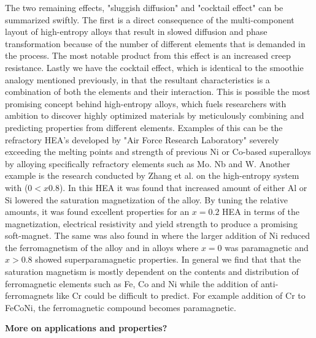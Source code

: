 The two remaining effects, "sluggish diffusion" and "cocktail effect" can be summarized swiftly. The first is a direct consequence of the multi-component layout of high-entropy alloys that result in slowed diffusion and phase transformation because of the number of different elements that is demanded in the process. The most notable product from this effect is an increased creep resistance. Lastly we have the cocktail effect, which is identical to the smoothie analogy mentioned previously, in that the resultant characteristics is a combination of both the elements and their interaction. This is possible the most promising concept behind high-entropy alloys, which fuels researchers with ambition to discover highly optimized materials by meticulously combining and predicting properties from different elements. Examples of this can be the refractory HEA's developed by "Air Force Research Laboratory" severely exceeding the melting points and strength of previous Ni or Co-based superalloys by alloying specifically refractory elements such as Mo. Nb and W. Another example is the research conducted by Zhang et al. on the high-entropy system  with ($0 < x 0.8$). In this HEA it was found that increased amount of either Al or Si lowered the saturation magnetization of the alloy. By tuning the relative amounts, it was found excellent properties for an $x=0.2$ HEA in terms of the magnetization, electrical resistivity and yield strength to produce a promising soft-magnet. The same was also found in  where the larger addition of Ni reduced the ferromagnetism of the alloy and in  alloys where $x = 0$ was paramagnetic and $x > 0.8$ showed superparamagnetic properties. In general we find that that the saturation magnetism is mostly dependent on the contents and distribution of ferromagnetic elements such as Fe, Co and Ni while the addition of anti-ferromagnets like Cr could be difficult to predict. For example addition of Cr to FeCoNi, the ferromagnetic compound becomes paramagnetic. 

\textbf{More on applications and properties?}
